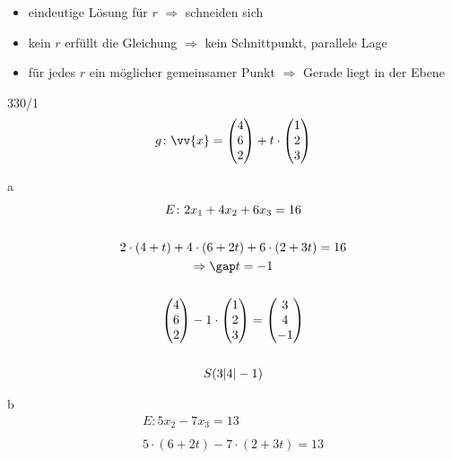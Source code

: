 \begin{itemize}
  \item eindeutige Lösung für $r$ $\Rightarrow$ schneiden sich
  \item kein $r$ erfüllt die Gleichung $\Rightarrow$ kein Schnittpunkt, parallele Lage
  \item für jedes $r$ ein möglicher gemeinsamer Punkt $\Rightarrow$ Gerade liegt in der Ebene
\end{itemize}
\begin{exercise}{330/1}
  \begin{gather*}
    g \colon \vv{x} = \begin{pmatrix}4 \\ 6 \\ 2\end{pmatrix} + t \cdot \begin{pmatrix}1 \\ 2 \\ 3\end{pmatrix}
  \end{gather*}
  \item [a]
  \begin{gather*}
    E \colon 2x_1 + 4x_2 + 6x_3 = 16 \\\\
    2 \cdot (4 + t) + 4 \cdot (6 + 2t) + 6 \cdot (2 + 3t) = 16 \\
    \Rightarrow\gap t = -1 \\\\
    \begin{pmatrix}4 \\ 6 \\ 2\end{pmatrix} - 1 \cdot \begin{pmatrix}1 \\ 2 \\ 3\end{pmatrix} = \begin{pmatrix}3 \\ 4 \\ -1\end{pmatrix} \\\\
    S(3|4|-1)
  \end{gather*}
  \item [b]
  \begin{gather*}
    E \colon 5x_2 - 7x_3 = 13 \\\\
    5 \cdot (6 + 2t) - 7 \cdot (2 + 3t) = 13 \\

\end{gather*}
\end{exercise}
